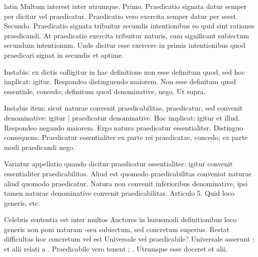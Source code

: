 \begin{otherlanguage*}{latin}
\pstart
  Multum interest inter utrumque. Primo. Praedicatio signata datur semper per dicitur vel praedicatur. Praedicatio vero exercita semper datur per seest. Secundo. Praedicatio signata tribuitur secundis intentionibus eo quid sint rationes praedicandi. At praedicatio exercita tribuitur naturis, cum significant subiectum secundum intentionum. Unde dicitur esse exercere in primis intentionibus quod praedicari signat in secundis et optime. 
\pend

\pstart
 Instabis: ex dictis colligitur in hac definitione non esse definitum quod, sed hoc implicat: igitur. Respondeo distinguendo maiorem. Non esse definitum quod essentiale, concedo; definitum quod denominative, nego. Ut supra. 
\pend

\pstart
 Instabis item: sicut naturae convenit praedicabilitas, praedicatur, sed convenit denominative: igitur \textnormal{|}   praedicatur denominative. Hoc implicat: igitur et illud. Respondeo negando maiorem. Ergo natura praedicatur essentialiter. Distinguo consequens. Praedicatur essentialiter ex parte rei praedicatae, concedo; ex parte modi praedicandi nego. 
\pend

\pstart
 Variatur appellatio quando dicitur praedicatur essentialiter: igitur convenit essentialiter praedicabilitas. Aliud est quomodo praedicabilitas conveniat naturae aliud quomodo praedicatur. Natura non convenit inferioribus denominative, ipsi tamen naturae denominative convenit praedicabilitas. Articulo 5. Quid loco generis, etc. 
\pend

        \pstart
        \pend
      
\pstart
 Celebris sententia est inter multos Auctores in huiusmodi definitionibus loco generis non poni naturam -seu subiectum, sed concretum superius. Restat difficultas hoc concretum vel est Universale vel praedicabile? Universale asserunt ;  et alii relati a . Praedicabile vero tenent ; . Utrumque esse doceret  et alii. 
\pend


\end{otherlanguage*}
